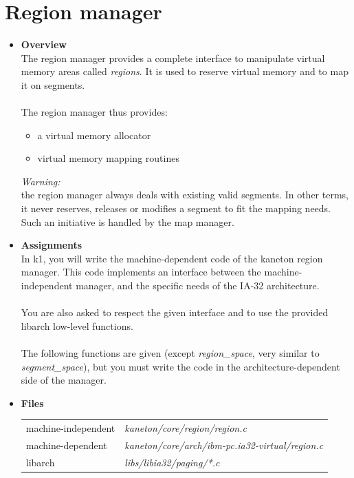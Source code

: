 \section{Region manager}
\begin{itemize}
  \item {\bf Overview}\\
    The region manager provides a complete interface to manipulate virtual memory
    areas called {\em regions}. It is used to reserve virtual memory and to map it
    on segments.\\
    \\
    The region manager thus provides:

    \begin{itemize}
      \item a virtual memory allocator
      \item virtual memory mapping routines\\
    \end{itemize}

    {\em Warning:}\\
    the region manager always deals with existing valid segments. In
    other terms, it never reserves, releases or modifies a segment to fit the mapping
    needs. Such an initiative is handled by the map manager.\\

  \item {\bf Assignments}\\
    In k1, you will write the machine-dependent code of the kaneton region manager.
    This code implements an interface between the machine-independent manager, and
    the specific needs of the IA-32 architecture.\\
    \\
    You are also asked to respect the given interface and to use the provided
    libarch low-level functions.\\
    \\
    The following functions are given (except \emph{region\_space}, very similar to \emph{segment\_space}), but you must write the code in
    the architecture-dependent side of the manager.

  \item {\bf Files}\\

    \begin{tabular}{| l | l |}
      \hline
      machine-independent & {\em kaneton/core/region/region.c}\\
      machine-dependent & {\em kaneton/core/arch/ibm-pc.ia32-virtual/region.c}\\
      libarch & {\em libs/libia32/paging/*.c}\\\hline
    \end{tabular}


\end{itemize}
